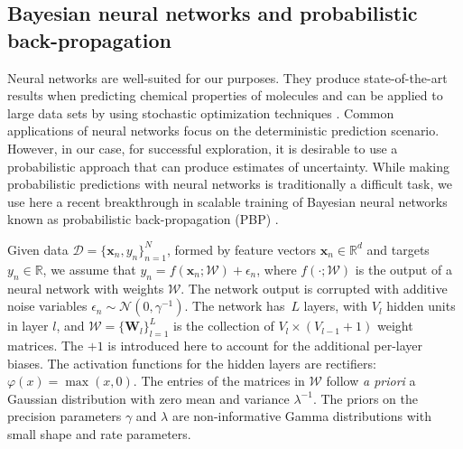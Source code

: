 \subsection{Bayesian neural networks and probabilistic back-propagation}

Neural networks are well-suited for our purposes. They produce state-of-the-art results when predicting chemical properties of molecules \cite{Ma_2015,Mayr_2016,ramsundar2015massively} and can be applied to large data sets by using stochastic optimization techniques \cite{bousquet2008tradeoffs}. Common applications of neural networks focus on the deterministic prediction scenario. However, in our case, for successful exploration, it is desirable to use a probabilistic approach that can produce estimates of uncertainty. While making probabilistic predictions with neural networks is traditionally a difficult task, we use here a recent breakthrough in scalable training of Bayesian neural networks known as probabilistic back-propagation (PBP) \cite{hernandez2015probabilistic}. 

Given data ${\mathcal{D} = \{\mathbf{x}_n, y_n \}_{n=1}^N}$, formed by feature vectors $\mathbf{x}_n \in \mathbb{R}^d$ and targets ${y_n \in \mathbb{R}}$, we assume that $y_n = f(\mathbf{x}_n;\mathcal{W}) + \epsilon_n$, where $f(\cdot ;\mathcal{W})$ is the output of a neural network with weights $\mathcal{W}$. The network output is corrupted with additive noise variables $\epsilon_n \sim \mathcal{N}(0,\gamma^{-1})$. The network has~$L$ layers, with $V_l$ hidden units in layer $l$, and $\mathcal{W} = \{ \mathbf{W}_l \}_{l=1}^L$ is the collection of $V_l \times (V_{l-1}+1)$ weight matrices. The $+1$ is introduced here to account for the additional per-layer biases. The activation functions for the hidden layers are rectifiers: $\varphi(x) = \max(x,0)$. The entries of the matrices in $\mathcal{W}$ follow \emph{a priori} a Gaussian distribution with zero mean and variance $\lambda^{-1}$. The priors on the precision parameters $\gamma$ and $\lambda$ are non-informative Gamma distributions with small shape and rate parameters.

